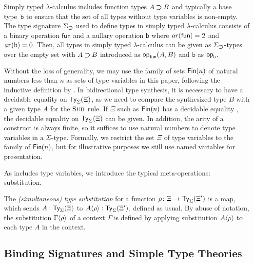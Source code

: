 \begin{example} \label{ex:type-signature-for-function-type}
  Simply typed $\lambda$-calculus includes function types $A \mathbin{\bm{\supset}} B$ and typically a base type~$\mathtt{b}$ to ensure that the set of all types without type variables is non-empty.
  The type signature $\Sigma_{\mathbin{\bm{\supset}}}$ used to define types in simply typed $\lambda$-calculus consists of a binary operation $\mathsf{fun}$ and a nullary operation $\mathsf{b}$ where $\mathit{ar}(\mathsf{fun}) = 2$ and $\mathit{ar}(\mathsf{b}) = 0$.
  Then, all types in simply typed $\lambda$-calculus can be given as $\Sigma_{\mathbin{\bm{\supset}}}$-types over the empty set with $A \mathbin{\bm{\supset}} B$ introduced as $\mathsf{op}_{\mathsf{fun}}(A, B)$ and $\mathtt{b}$ as $\mathsf{op}_{\mathsf{b}}$. 
\end{example}

Without the loss of generality, we may use the family of sets $\mathsf{Fin}(n)$ of natural numbers less than $n$ as sets of type variables in this paper, following the inductive definition by \citet{Dybjer1994}.
In bidirectional type synthesis, it is necessary to have a decidable equality on $\mathsf{Ty}_{\Sigma}(\Xi)$, as we need to compare the synthesized type $B$ with a given type $A$ for the $\textnormal{\textsc{Sub}}$ rule.
If $\Xi$ such as $\mathsf{Fin}(n)$ has a decidable equality , the decidable equality on $\mathsf{Ty}_{\Sigma}(\Xi)$ can be given.
In addition, the arity of a construct is always finite, so it suffices to use natural numbers to denote type variables in a $\Sigma$-type.
Formally, we restrict the set $\Xi$ of type variables to the family of $\mathsf{Fin}(n)$, but for illustrative purposes we still use named variables for presentation.

As  includes type variables, we introduce the typical meta-operations: substitution.
\begin{definition}
  The \emph{(simultaneous) type substitution} for a function $\rho\colon\Xi \to \mathsf{Ty}_{\Sigma}(\Xi')$ is a map, which sends $A : \mathsf{Ty}_{\Sigma}(\Xi)$ to ${A}\!\left<{\rho}\right> : \mathsf{Ty}_{\Sigma}(\Xi')$, defined as usual.
  By abuse of notation, the substitution ${\Gamma}\!\left<{\rho}\right>$ of a context $\Gamma$ is defined by applying substitution ${A}\!\left<{\rho}\right>$ to each type $A$ in the context.
\end{definition}

\subsection{Binding Signatures and Simple Type Theories} \label{subsec:binding-sig}

